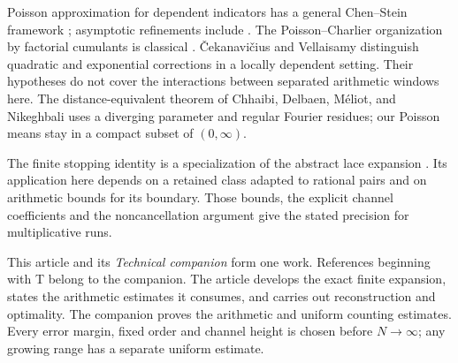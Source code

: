 Poisson approximation for dependent indicators has a general
Chen--Stein framework \cite{agg1989}; asymptotic refinements include
\cite{barbour1987,barboureagleson1987}.
The Poisson--Charlier organization by factorial cumulants is classical
\cite[Sections~5 and~8.1]{bkn2014}.
\v{C}ekanavi\v{c}ius and Vellaisamy
\cite[Theorems~3.1--3.2]{cekanaviciusvellaisamy2015} distinguish
quadratic and exponential corrections in a locally dependent setting.
Their hypotheses do not cover the interactions between separated
arithmetic windows here. The distance-equivalent theorem of
Chhaibi, Delbaen, M\'eliot, and Nikeghbali
\cite[Theorem~3.11]{chhaibietal2020} uses a diverging parameter and
regular Fourier residues; our Poisson means stay in a compact
subset of \((0,\infty)\).

The finite stopping identity is a specialization of the abstract
lace expansion \cite{zeilberger1997}. Its application here depends
on a retained class adapted to rational pairs and on arithmetic
bounds for its boundary. Those bounds, the explicit channel
coefficients and the noncancellation argument give the stated
precision for multiplicative runs.

This article and its \emph{Technical companion} form one work.
References beginning with T belong to the companion. The article
develops the exact finite expansion, states the arithmetic estimates
it consumes, and carries out reconstruction and optimality. The
companion proves the arithmetic and uniform counting estimates.
Every error margin, fixed order and channel height is chosen before
\(N\to\infty\); any growing range has a separate uniform estimate.
\label{p1:intro:notation}
